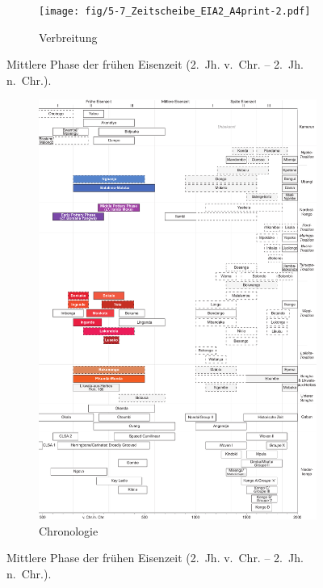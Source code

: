 \begin{figure}[p]
	\centering
	\begin{subfigure}[b]{\textwidth}
		\centering
		\texttt{[image: fig/5-7\_Zeitscheibe\_EIA2\_A4print-2.pdf]}
		\vspace{4cm}
		\caption{Verbreitung}
		\label{fig:EIA2_Karte}
	\end{subfigure}
	\caption{Mittlere Phase der frühen Eisenzeit (2.~Jh. v.~Chr. -- 2.~Jh. n.~Chr.).}
	\label{}
\end{figure}
\addtocounter{figure}{-1}
\begin{figure}[p]
	\begin{subfigure}[b]{\textwidth}
		\setcounter{subfigure}{1}
		\centering
		\includegraphics[height = .9\textheight]{fig/Chronologiesystem_v4_Zeitscheibe_EIA2.pdf}
		\caption{Chronologie}
		\label{fig:EIA2_Chronologie}
	\end{subfigure}
	\caption{Mittlere Phase der frühen Eisenzeit (2.~Jh. v.~Chr. -- 2.~Jh. n.~Chr.).}
	\label{fig:EIA2}
\end{figure}

